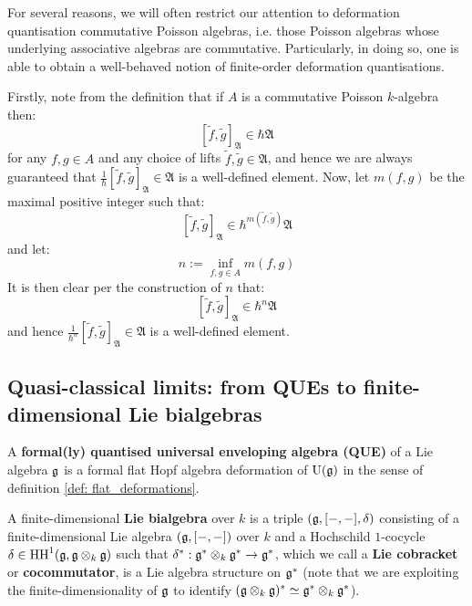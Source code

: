         \begin{remark}
            For several reasons, we will often restrict our attention to deformation quantisation commutative Poisson algebras, i.e. those Poisson algebras whose underlying associative algebras are commutative. Particularly, in doing so, one is able to obtain a well-behaved notion of finite-order deformation quantisations.  
            
            Firstly, note from the definition that if $A$ is a commutative Poisson $k$-algebra then:
                $$[\tilde{f}, \tilde{g}]_{\mathfrak{A}} \in \hbar \mathfrak{A}$$
            for any $f, g \in A$ and any choice of lifts $\tilde{f}, \tilde{g} \in \mathfrak{A}$, and hence we are always guaranteed that $\frac{1}{\hbar}[\tilde{f}, \tilde{g}]_{\mathfrak{A}} \in \mathfrak{A}$ is a well-defined element. Now, let $m(f, g)$ be the maximal positive integer such that:
                $$[\tilde{f}, \tilde{g}]_{\mathfrak{A}} \in \hbar^{m(\tilde{f}, \tilde{g})} \mathfrak{A}$$
            and let:
                $$n := \inf_{f, g \in A} m(f, g)$$
            It is then clear per the construction of $n$ that:
                $$[\tilde{f}, \tilde{g}]_{\mathfrak{A}} \in \hbar^n \mathfrak{A}$$
            and hence $\frac{1}{\hbar^n}[\tilde{f}, \tilde{g}]_{\mathfrak{A}} \in \mathfrak{A}$ is a well-defined element. 
        \end{remark}
    
    \subsection{Quasi-classical limits: from QUEs to finite-dimensional Lie bialgebras}
        \begin{definition} \label{def: formal_QUEs}
            A \textbf{formal(ly) quantised universal enveloping algebra (QUE)} of a Lie algebra $\mathfrak{g}$ is a formal flat Hopf algebra deformation of $\mathrm{U}(\mathfrak{g})$ in the sense of definition \ref{def: flat_deformations}.
        \end{definition}
    
        \begin{definition} \label{def: finite_dimensional_lie_bialgebras}
            A finite-dimensional \textbf{Lie bialgebra} over $k$ is a triple $(\mathfrak{g}, [-, -], \delta)$ consisting of a finite-dimensional Lie algebra $(\mathfrak{g}, [-, -])$ over $k$ and a Hochschild $1$-cocycle $\delta \in \HH^1(\g, \g \tensor_k \g)$ such that $\delta^*: \g^* \tensor_k \g^* \to \g^*$, which we call a \textbf{Lie cobracket} or \textbf{cocommutator}, is a Lie algebra structure on $\mathfrak{g}^*$ (note that we are exploiting the finite-dimensionality of $\mathfrak{g}$ to identify $(\g \tensor_k \g)^* \cong \g^* \tensor_k \g^*$). 
        \end{definition}
        \begin{remark}
            
        \end{remark}
    
